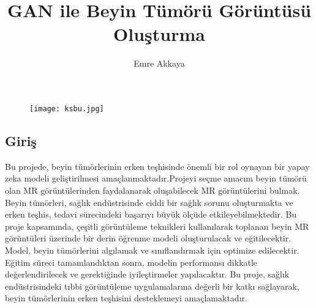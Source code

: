 \documentclass[12pt,a4paper]{article}
\date{}
\title{GAN ile Beyin Tümörü Görüntüsü Oluşturma}
\author{Emre Akkaya}
\begin{document}
	\begin{figure}[t!]
		\centering
		\texttt{[image: ksbu.jpg]}
	\end{figure}
	\maketitle
	\maketitle
	\begin{center}
	\section*{Giriş}
	\end{center}


Bu projede, beyin tümörlerinin erken teşhisinde önemli bir rol oynayan bir yapay zeka modeli geliştirilmesi amaçlanmaktadır.Projeyi seçme amacım beyin tümörü olan MR görüntülerinden faydalanarak oluşabilecek MR görüntülerini bulmak. Beyin tümörleri, sağlık endüstrisinde ciddi bir sağlık sorunu oluşturmakta ve erken teşhis, tedavi sürecindeki başarıyı büyük ölçüde etkileyebilmektedir. Bu proje kapsamında, çeşitli görüntüleme teknikleri kullanılarak toplanan beyin MR görüntüleri üzerinde bir derin öğrenme modeli oluşturulacak ve eğitilecektir. Model, beyin tümörlerini algılamak ve sınıflandırmak için optimize edilecektir. Eğitim süreci tamamlandıktan sonra, modelin performansı dikkatle değerlendirilecek ve gerektiğinde iyileştirmeler yapılacaktır. Bu proje, sağlık endüstrisindeki tıbbi görüntüleme uygulamalarına değerli bir katkı sağlayarak, beyin tümörlerinin erken teşhisini desteklemeyi amaçlamaktadır.



	
	
\end{document}
